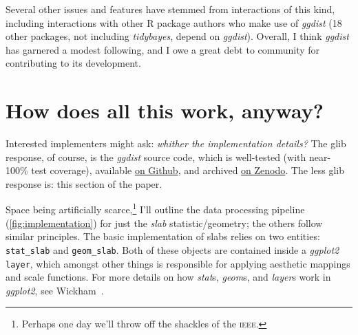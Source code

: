 \documentclass[journal]{vgtc}                     %
\begin{document}
Several other issues and features have stemmed from interactions of this kind, including interactions with other R package authors who make use of \textit{ggdist}  (18 other packages, not including \textit{tidybayes}, depend on \textit{ggdist}). Overall, I think \textit{ggdist} has garnered a modest following, and I owe a great debt to community for contributing to its development.

\section{How does all this work, anyway?}
\label{sec:implementation}

Interested implementers might ask: \textit{whither the implementation details?} The glib response, of course, is the \textit{ggdist} source code, which is well-tested (with near-100\% test coverage), available \href{https://github.com/mjskay/ggdist}{on Github}, and archived \href{https://doi.org/10.5281/zenodo.3879620}{on Zenodo}. The less glib response is: this section of the paper. 


Space being artificially scarce,\footnote{Perhaps one day we'll throw off the shackles of the \textsc{ieee}.} I'll outline the data processing pipeline (\cref{fig:implementation}) for just the \textit{slab} statistic/geometry; the others follow similar principles. The basic implementation of slabs relies on two entities: \texttt{stat\_slab} and \texttt{geom\_slab}. Both of these objects are contained inside a \textit{ggplot2} \texttt{layer}, which amongst other things is responsible for applying aesthetic mappings and scale functions. For more details on how \textit{stat}s, \textit{geom}s, and \textit{layer}s work in \textit{ggplot2}, see Wickham~\cite{wickham2010layered}.
\end{document}
